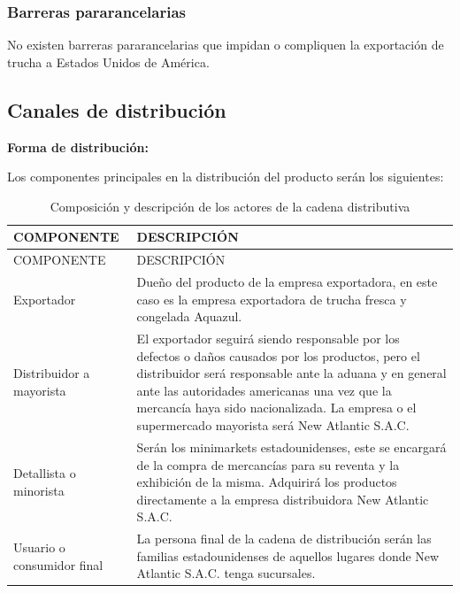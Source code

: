 \documentclass[
  stu,
  floatsintext,
  longtable,
  a4paper,
  nolmodern,
  notxfonts,
  notimes,
  colorlinks=true,linkcolor=blue,citecolor=blue,urlcolor=blue]{apa7}
\begin{document}
\subsubsection{Barreras pararancelarias}\label{barreras-pararancelarias}

No existen barreras pararancelarias que impidan o compliquen la
exportación de trucha a Estados Unidos de América.

\subsection{Canales de distribución}\label{canales-de-distribuciuxf3n}

\textbf{Forma de distribución:}

Los componentes principales en la distribución del producto serán los
siguientes:

\begin{longtable}[]{@{}
  >{\raggedright\arraybackslash}p{}
  >{\raggedright\arraybackslash}p{}@{}}
\caption{Composición y descripción de los actores de la cadena
distributiva}\tabularnewline
\toprule\noalign{}
\begin{minipage}[b]{\linewidth}\raggedright
COMPONENTE
\end{minipage} & \begin{minipage}[b]{\linewidth}\raggedright
DESCRIPCIÓN
\end{minipage} \\
\midrule\noalign{}
\endfirsthead
\toprule\noalign{}
\begin{minipage}[b]{\linewidth}\raggedright
COMPONENTE
\end{minipage} & \begin{minipage}[b]{\linewidth}\raggedright
DESCRIPCIÓN
\end{minipage} \\
\midrule\noalign{}
\endhead
\bottomrule\noalign{}
\endlastfoot
Exportador & Dueño del producto de la empresa exportadora, en este caso
es la empresa exportadora de trucha fresca y congelada Aquazul. \\
Distribuidor a mayorista & El exportador seguirá siendo responsable por
los defectos o daños causados por los productos, pero el distribuidor
será responsable ante la aduana y en general ante las autoridades
americanas una vez que la mercancía haya sido nacionalizada. La empresa
o el supermercado mayorista será New Atlantic S.A.C. \\
Detallista o minorista & Serán los minimarkets estadounidenses, este se
encargará de la compra de mercancías para su reventa y la exhibición de
la misma. Adquirirá los productos directamente a la empresa
distribuidora New Atlantic S.A.C. \\
Usuario o consumidor final & La persona final de la cadena de
distribución serán las familias estadounidenses de aquellos lugares
donde New Atlantic S.A.C. tenga sucursales. \\
\end{longtable}
\end{document}
